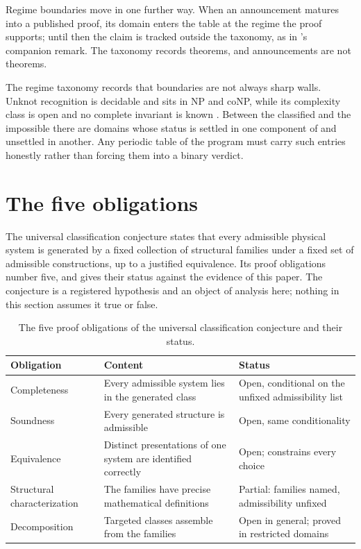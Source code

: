 \documentclass[11pt,letterpaper]{article}
\theoremstyle{definition}
\theoremstyle{remark}
\begin{document}
Regime boundaries move in one further way. When an announcement matures into a published proof, its domain enters the table at the regime the proof supports; until then the claim is tracked outside the taxonomy, as in 's companion remark. The taxonomy records theorems, and announcements are not theorems.

The regime taxonomy records that boundaries are not always sharp walls. Unknot recognition is decidable and sits in NP and coNP, while its complexity class is open and no complete invariant is known \cite{hass1999,lackenby2021}. Between the classified and the impossible there are domains whose status is settled in one component of  and unsettled in another. Any periodic table of the program must carry such entries honestly rather than forcing them into a binary verdict.

\section{The five obligations}

The universal classification conjecture states that every admissible physical system is generated by a fixed collection of structural families under a fixed set of admissible constructions, up to a justified equivalence. Its proof obligations number five, and  gives their status against the evidence of this paper. The conjecture is a registered hypothesis and an object of analysis here; nothing in this section assumes it true or false.

\begin{table}[ht]
\centering
\caption{The five proof obligations of the universal classification conjecture and their status.}
\label{tab:obligations}
\small
\begin{tabular}{L{3.6cm}L{5.4cm}L{3.2cm}}
\toprule
Obligation & Content & Status \\
\midrule
Completeness & Every admissible system lies in the generated class & Open, conditional on the unfixed admissibility list \\
Soundness & Every generated structure is admissible & Open, same conditionality \\
Equivalence & Distinct presentations of one system are identified correctly & Open;  constrains every choice \\
Structural characterization & The families have precise mathematical definitions & Partial: families named, admissibility unfixed \\
Decomposition & Targeted classes assemble from the families & Open in general; proved in restricted domains \\
\bottomrule
\end{tabular}
\end{table}
\end{document}
